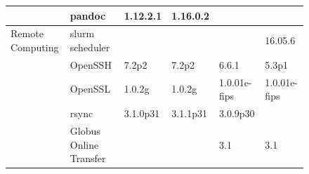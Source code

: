 \begin{figure}[!htp]
\begin{table}[!ht]
{\begin{tabular}{|ll|l|l|l|l|}
\rowcolor{black!10}
\cellcolor{white}                                                      & \multicolumn{1}{|l|}{pandoc}                 & 1.12.2.1                                                            & 1.16.0.2                                                          &                                                                        &                                                \\
\hline
\rowcolor{black!5}
\cellcolor{white} Remote Computing                                     & \multicolumn{1}{|l|}{slurm scheduler}        &                                                                     &                                                                   &                                                                        & 16.05.6                                        \\
\rowcolor{black!10}
\cellcolor{white}                                                      & \multicolumn{1}{|l|}{OpenSSH}                & 7.2p2                                                               & 7.2p2                                                             & 6.6.1                                                                  & 5.3p1                                          \\
\rowcolor{black!5}
\cellcolor{white}                                                      & \multicolumn{1}{|l|}{OpenSSL}                & 1.0.2g                                                              & 1.0.2g                                                            & 1.0.01e-fips                                                           & 1.0.01e-fips                                   \\
\rowcolor{black!10}
\cellcolor{white}                                                      & \multicolumn{1}{|l|}{rsync}                  & 3.1.0p31                                                            & 3.1.1p31                                                          & 3.0.9p30                                                               &                                                \\
\rowcolor{black!5}
\cellcolor{white}                                                      & \multicolumn{1}{|l|}{Globus Online Transfer} &                                                                     &                                                                   & 3.1                                                                    & 3.1                                            \\

\end{tabular}}
\end{table}
\end{figure}

